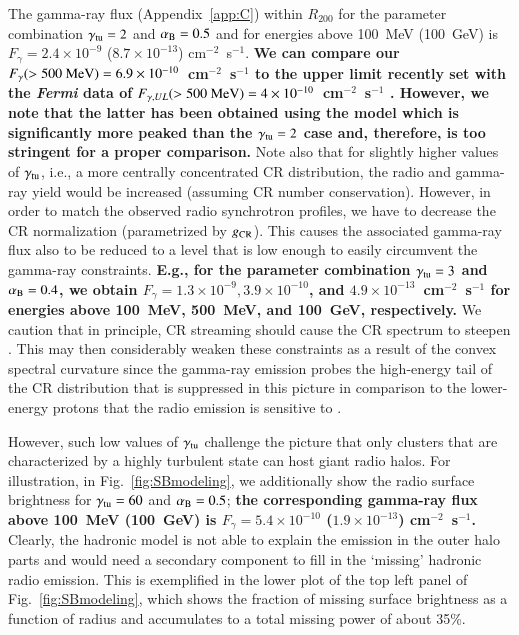 \documentclass[useAMS,usenatbib]{mn2e}
\begin{document}
The gamma-ray flux (Appendix~\ref{app:C}) within $R_{200}$ for the parameter
combination $\gamma_{{\mathrm{tu}}} = 2$ and $\alpha_{{\mathrm{B}}}=0.5$ and for energies
above 100~MeV (100~GeV) is $F_{\gamma} = 2.4 \times 10^{-9}$ ($8.7 \times
10^{-13}$) cm$^{-2}$~s$^{-1}$. 
{\bf We can compare our $F_{\gamma} (>500~{\mathrm{MeV}}) = 6.9 \times10^{-10}$~cm$^{-2}$~s$^{-1}$
to the upper limit recently set with the \emph{Fermi} data of $F_{\gamma, UL} (>500~{\mathrm{MeV}}) 
= 4 \times 10^{-10}$~cm$^{-2}$~s$^{-1}$ \citep{2013arXiv1308.5654T}.  
However, we note that the latter has been obtained using the \cite{2010MNRAS.409..449P}
model which is significantly more peaked than the $\gamma_{{\mathrm{tu}}} = 2$ case
and, therefore, is too stringent for a proper comparison.}
Note also that for slightly higher values of $\gamma_{{\mathrm{tu}}}$, i.e., a more centrally
concentrated CR distribution, the radio and gamma-ray yield would be increased
(assuming CR number conservation). However, in order to match the observed radio
synchrotron profiles, we have to decrease the CR normalization (parametrized by
$g_{{\mathrm{CR}}}$). This causes the associated gamma-ray flux also to be reduced to
a level that is low enough to easily circumvent the gamma-ray constraints. 
{\bf E.g., for the parameter combination $\gamma_{{\mathrm{tu}}} = 3$ and
$\alpha_{{\mathrm{B}}}=0.4$, we obtain $F_{\gamma} = 1.3 \times 10^{-9}, 3.9 \times 10^{-10}$,
and $4.9 \times 10^{-13}$~cm$^{-2}$~s$^{-1}$ for energies above 100~MeV, 500~MeV,
and 100~GeV, respectively.}  We caution that in principle, CR streaming
should cause the CR spectrum to steepen \citep{2013arXiv1303.4746W}.  
This may then considerably weaken these constraints as a result of the convex spectral 
curvature since the gamma-ray emission probes the high-energy tail of the CR distribution 
that is suppressed in this picture in comparison to the lower-energy protons that the
radio emission is sensitive to \citep[see][for an extended discussion of this
point]{2011arXiv1111.5544M}.

However, such low values of $\gamma_{{\mathrm{tu}}}$ challenge the picture
that only clusters that are characterized by a highly turbulent state can host
giant radio halos. For illustration, in Fig.~\ref{fig:SBmodeling}, we
additionally show the radio surface brightness for $\gamma_{{\mathrm{tu}}} = 60$ and
$\alpha_{{\mathrm{B}}}=0.5$; {\bf the corresponding gamma-ray flux above 100~MeV 
(100~GeV) is $F_{\gamma} = 5.4 \times 10^{-10}$ ($1.9 \times
10^{-13}$) cm$^{-2}$~s$^{-1}$.} 
Clearly, the hadronic model is not able to explain the
emission in the outer halo parts and would need a secondary component to fill in
the `missing' hadronic radio emission. This is exemplified in the lower plot of
the top left panel of Fig.~\ref{fig:SBmodeling}, which shows the fraction of
missing surface brightness as a function of radius and accumulates to a total
missing power of about 35\%.
\end{document}
